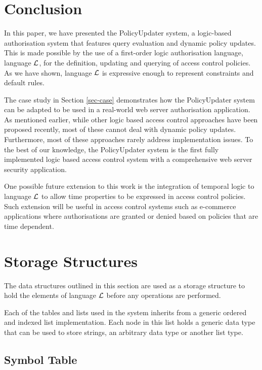 \documentclass[global,twocolumn,final]{svjour}
\makeatletter
\newcommand{\vappsection}[1]{
  \renewcommand{\@seccntformat}[1]{
    \appendixname\hspace{0.5em}\csname the##1\endcsname \hspace{1em}
  }
  \section{#1}
  \renewcommand{\@seccntformat}[1]{
    \csname the##1\endcsname\hspace{1em}
  }
}
\makeatother
\begin{document}
  \section{Conclusion}
    \label{sec-conclusion}

    In this paper, we have presented the PolicyUpdater system, a logic-based
    authorisation system that features query evaluation and dynamic policy
    updates. This is made possible by the use of a first-order logic
    authorisation language, language ${\cal L}$, for the definition, updating
    and querying of access control policies. As we have shown, language
    ${\cal L}$ is expressive enough to represent constraints and default rules.

    The case study in Section \ref{sec-case} demonstrates how the PolicyUpdater
    system can be adapted to be used in a real-world web server authorisation
    application. As mentioned earlier, while other logic based access control
    approaches have been proposed recently, most of these cannot deal with
    dynamic policy updates. Furthermore, most of these approaches rarely
    address implementation issues. To the best of our knowledge, the
    PolicyUpdater system is the first fully implemented logic based access
    control system with a comprehensive web server security application.

    One possible future extension to this work is the integration of temporal
    logic to language ${\cal L}$ to allow time properties to be expressed in
    access control policies. Such extension will be useful in access control
    systems such as e-commerce applications where authorisations are granted
    or denied based on policies that are time dependent.

  \appendix

  \vappsection{Storage Structures}

    \label{app-store}

    The data structures outlined in this section are used as a storage
    structure to hold the elements of language ${\cal L}$ before any
    operations are performed.

    Each of the tables and lists used in the system inherits from a generic
    ordered and indexed list implementation. Each node in this list holds a
    generic data type that can be used to store strings, an arbitrary data
    type or another list type.

    \subsection{Symbol Table}
\end{document}
